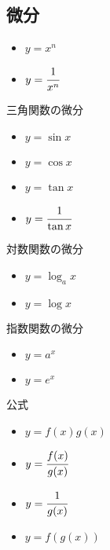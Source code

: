 \documentclass[10pt,dvipdfmx]{jsarticle}
\begin{document}
\subsection*{微分}
\begin{multicols}{2}
  \begin{Large}
    \begin{itemize}
      \item $y=x^n$
      \item $y=\cfrac{1}{x^n}$
    \end{itemize}
  \end{Large}
\end{multicols}
三角関数の微分
\begin{multicols}{2}
  \begin{Large}
    \begin{itemize}
      \item $y=\sin x$
      \item $y=\cos x$
      \item $y=\tan x$
      \item $y=\cfrac{1}{\tan x}$
    \end{itemize}
  \end{Large}
\end{multicols}

対数関数の微分
\begin{multicols}{2}
  \begin{Large}
    \begin{itemize}
      \item $y=\log_a x$
      \item $y=\log x$
    \end{itemize}
  \end{Large}
\end{multicols}

指数関数の微分
\begin{multicols}{2}
  \begin{Large}
    \begin{itemize}
      \item $y=a^x$
      \item $y=e^x$
    \end{itemize}
  \end{Large}
\end{multicols}

公式
\begin{multicols}{2}
  \begin{Large}
    \begin{itemize}
      \item $y=f(x)g(x)$
      \item $y=\cfrac{f(x)}{g(x)}$
      \item $y=\cfrac{1}{g(x)}$
      \item $y=f(g(x))$
    \end{itemize}
  \end{Large}
\end{multicols}
\end{document}
